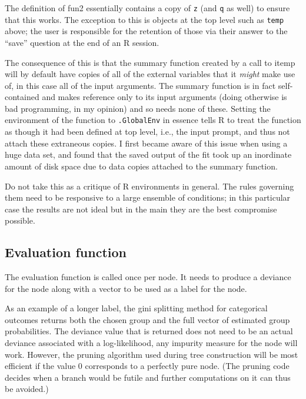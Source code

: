 \Rcodeplaceholder{}

The definition of fun2 essentially contains a copy of \texttt{z} (and
\texttt{q} as well) to ensure that this works.
The exception to this is objects at the top level such as
\texttt{temp} above; the user is responsible
for the retention of those via their answer to the ``save'' question at
the end of an R session.

The consequence of this is that the summary function created by a
call to itemp will by default have copies of all of the external variables
that it \emph{might} make use of, in this case all of the input arguments.
The summary function is in fact self-contained and makes reference only to
its input arguments (doing otherwise is bad programming, in my
opinion) and so needs none of these.
Setting the environment of the function to \texttt{.GlobalEnv} in essence
tells R to treat the function as though it had been defined at top level,
i.e., the input prompt, and thus not attach these extraneous copies.
I first became aware of this issue when using a huge data set, and found that
the saved output of the fit took up an inordinate amount of disk space due
to data copies attached to the summary function.

Do not take this as a critique of R environments in general.
The rules governing them need to be responsive to a large ensemble of
conditions; in this particular case the results are not ideal but in the main
they are the best compromise possible.

\subsection{Evaluation function}
The evaluation function is called once per node.
It needs to produce a deviance for the node along with a vector to be
used as a label for the node.

\Rcodeplaceholder{}

As an example of a longer label, the gini splitting method for
categorical outcomes returns both the chosen group and the full vector
of estimated group probabilities.
The deviance value that is returned does not need to be an actual
deviance associated with a log-likelihood, any impurity measure for
the node will work.
However, the pruning algorithm used during tree construction will be most
efficient if the value 0 corresponds to a perfectly pure node.
(The pruning code decides when a branch would be futile and further
computations on it can thus be avoided.)

